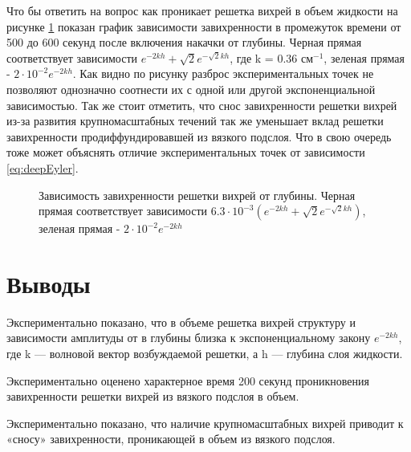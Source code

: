Что бы ответить на вопрос как проникает решетка вихрей в объем жидкости на рисунке \ref{img:depth} показан график зависимости завихренности в промежуток времени от 500 до 600 секунд после включения накачки от глубины. Черная прямая соответствует зависимости $e^{-2kh}+\sqrt{2}e^{-\sqrt{2}kh}$, где k = 0.36 см$^{-1}$, зеленая прямая - $2 \cdot 10^{-2} e^{-2kh}$. Как видно по рисунку разброс экспериментальных точек не позволяют однозначно соотнести их с одной или другой экспоненциальной зависимостью. Так же стоит отметить, что снос завихренности решетки вихрей из-за развития крупномасштабных течений так же уменьшает вклад решетки завихренности продиффундировавшей из вязкого подслоя. Что в свою очередь тоже может объяснять отличие экспериментальных точек от зависимости \ref{eq:deepEyler}.

\begin{figure}[ht]
  \caption{Зависимость завихренности решетки вихрей от глубины. Черная прямая соответствует зависимости $6.3 \cdot 10^{-3} (e^{-2kh}+\sqrt{2}e^{-\sqrt{2}kh})$, зеленая прямая - $2 \cdot 10^{-2} e^{-2kh}$}
  \label{img:depth}  
\end{figure}


\section{Выводы} \label{sect6_5}
Экспериментально показано, что в объеме решетка вихрей структуру и зависимости амплитуды от в глубины близка к  экспоненциальному закону $e^{-2kh}$, где k — волновой вектор возбуждаемой решетки, а h — глубина слоя жидкости. 


Экспериментально оценено характерное время 200 секунд проникновения завихренности решетки вихрей из вязкого подслоя в объем.

Экспериментально показано, что наличие крупномасштабных вихрей приводит к «сносу» завихренности, проникающей в объем из вязкого подслоя.
